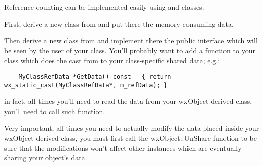 Reference counting can be implemented easily using 
and  classes.

First, derive a new class from  and
put there the memory-consuming data.

Then derive a new class from  and implement there
the public interface which will be seen by the user of your class.
You'll probably want to add a function to your class which does the cast from
 to your class-specific shared data; e.g.:

\begin{verbatim}
    MyClassRefData *GetData() const   { return wx_static_cast(MyClassRefData*, m_refData); }
\end{verbatim}

in fact, all times you'll need to read the data from your wxObject-derived class,
you'll need to call such function.

Very important, all times you need to actually modify the data placed inside your
wxObject-derived class, you must first call the wxObject::UnShare
function to be sure that the modifications won't affect other instances which are
eventually sharing your object's data.


